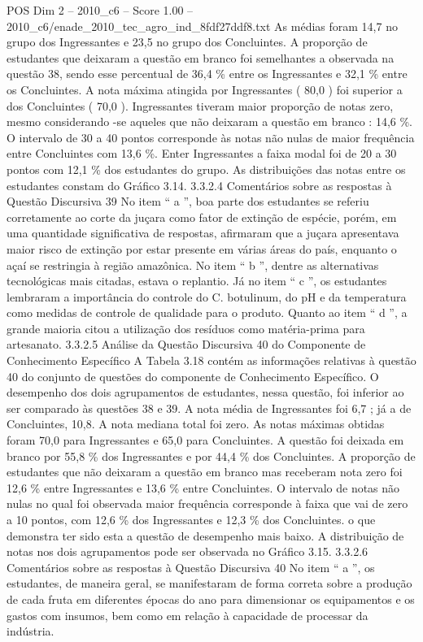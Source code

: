 \begin{textsample}{POS Dim 2 – 2010\_c6 – Score 1.00 – 2010\_c6/enade\_2010\_tec\_agro\_ind\_8fdf27ddf8.txt}
As médias foram 14,7 no grupo dos Ingressantes e 23,5 no grupo dos Concluintes.
A proporção de estudantes que deixaram a questão em branco foi semelhantes a observada na questão 38, sendo esse percentual de 36,4 \% entre os Ingressantes e 32,1 \% entre os Concluintes.
A nota máxima atingida por Ingressantes ( 80,0 ) foi superior a dos Concluintes ( 70,0 ).
Ingressantes tiveram maior proporção de notas zero, mesmo considerando -se aqueles que não deixaram a questão em branco : 14,6 \%.
O intervalo de 30 a 40 pontos corresponde às notas não nulas de maior frequência entre Concluintes com 13,6 \%.
Enter Ingressantes a faixa modal foi de 20 a 30 pontos com 12,1 \% dos estudantes do grupo.
As distribuições das notas entre os estudantes constam do Gráfico 3.14. 3.3.2.4 Comentários sobre as respostas à Questão Discursiva 39 No item “ a ”, boa parte dos estudantes se referiu corretamente ao corte da juçara como fator de extinção de espécie, porém, em uma quantidade significativa de respostas, afirmaram que a juçara apresentava maior risco de extinção por estar presente em várias áreas do país, enquanto o açaí se restringia à região amazônica.
No item “ b ”, dentre as alternativas tecnológicas mais citadas, estava o replantio.
Já no item “ c ”, os estudantes lembraram a importância do controle do C. botulinum, do pH e da temperatura como medidas de controle de qualidade para o produto.
Quanto ao item “ d ”, a grande maioria citou a utilização dos resíduos como matéria-prima para artesanato. 3.3.2.5 Análise da Questão Discursiva 40 do Componente de Conhecimento Específico A Tabela 3.18 contém as informações relativas à questão 40 do conjunto de questões do componente de Conhecimento Específico.
O desempenho dos dois agrupamentos de estudantes, nessa questão, foi inferior ao ser comparado às questões 38 e 39.
A nota média de Ingressantes foi 6,7 ; já a de Concluintes, 10,8.
A nota mediana total foi zero.
As notas máximas obtidas foram 70,0 para Ingressantes e 65,0 para Concluintes.
A questão foi deixada em branco por 55,8 \% dos Ingressantes e por 44,4 \% dos Concluintes.
A proporção de estudantes que não deixaram a questão em branco mas receberam nota zero foi 12,6 \% entre Ingressantes e 13,6 \% entre Concluintes.
O intervalo de notas não nulas no qual foi observada maior frequência corresponde à faixa que vai de zero a 10 pontos, com 12,6 \% dos Ingressantes e 12,3 \% dos Concluintes. o que demonstra ter sido esta a questão de desempenho mais baixo.
A distribuição de notas nos dois agrupamentos pode ser observada no Gráfico 3.15. 3.3.2.6 Comentários sobre as respostas à Questão Discursiva 40 No item “ a ”, os estudantes, de maneira geral, se manifestaram de forma correta sobre a produção de cada fruta em diferentes épocas do ano para dimensionar os equipamentos e os gastos com insumos, bem como em relação à capacidade de processar da indústria.

\end{textsample}
